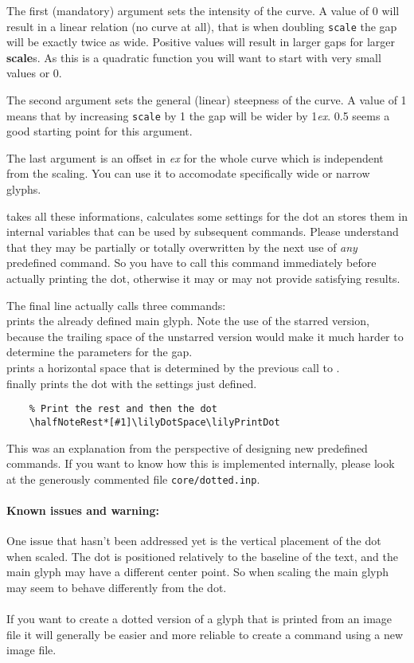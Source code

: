 \documentclass{article}
\begin{document}
The first (mandatory) argument sets the intensity of the curve.
A value of 0 will result in a linear relation (no curve at all), that is when doubling \texttt{scale} the gap will be exactly twice as wide.
Positive values will result in larger gaps for larger \textbf{scale}s.
As this is a quadratic function you will want to start with very small values or 0.

The second argument sets the general (linear) steepness of the curve.
A value of 1 means that by increasing \texttt{scale} by 1 the gap will be wider by 1\emph{ex}.
0.5 seems a good starting point for this argument.

The last argument is an offset in \emph{ex} for the whole curve which is independent from the scaling.
You can use it to accomodate specifically wide or narrow glyphs.

 takes all these informations, calculates some settings for the dot an stores them in internal variables that can be used by subsequent commands.
Please understand that they may be partially or totally overwritten by the next use of \emph{any} predefined command.
So you have to call this command immediately before actually printing the dot, otherwise it may or may not provide satisfying results.

The final line actually calls three commands:\\
 prints the already defined main glyph.
Note the use of the starred version, because the trailing space of the unstarred version would make it much harder to determine the parameters for the gap.\\
 prints a horizontal space that is determined by the previous call to .\\
 finally prints the dot with the settings just defined.

\begin{verbatim}
    % Print the rest and then the dot
    \halfNoteRest*[#1]\lilyDotSpace\lilyPrintDot
\end{verbatim}

This was an explanation from the perspective of designing new predefined commands.
If you want to know how this is implemented internally, please look at the generously commented file \texttt{core/dotted.inp}.

\paragraph*{Known issues and warning:} 
One issue that hasn't been addressed yet is the vertical placement of the dot when scaled.
The dot is positioned relatively to the baseline of the text, and the main glyph may have a different center point. 
So when scaling the main glyph may seem to behave differently from the dot.\\~\\
If you want to create a dotted version of a glyph that is printed from an image file it will generally be easier and more reliable to create a command using a new image file.
\end{document}
